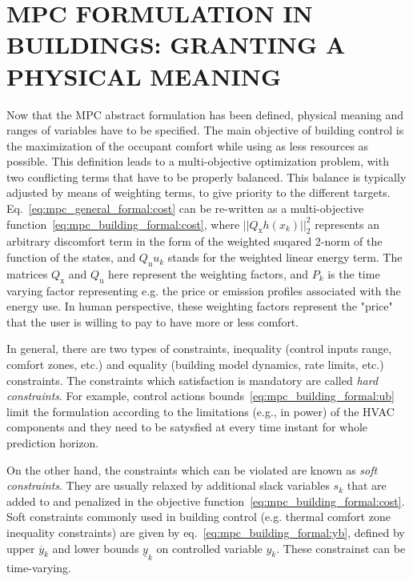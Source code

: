 \documentclass[10pt]{extarticle}
\begin{document}
\section{MPC FORMULATION IN BUILDINGS: GRANTING A PHYSICAL MEANING }

Now that the MPC abstract formulation has been defined, 
physical meaning and ranges of variables have to be specified.
The main objective of building control is the maximization of 
the occupant comfort while using as less resources as possible. 
This definition leads to a multi-objective optimization problem,
with two conflicting terms that have to be properly balanced. 
This balance is typically adjusted by means of weighting terms,
to give priority to the different targets.  
Eq.~\eqref{eq:mpc_general_formal:cost}
can be re-written as a multi-objective function~\eqref{eq:mpc_building_formal:cost},
where $||{Q_{\text{x}} h(x_{k})}||_2^2$ represents an arbitrary
discomfort term in the form of the weighted suqared 2-norm of
the function of the states, and ${Q_{\text{u}} u_{k}}$ stands
for the weighted linear energy term. The matrices $Q_{\text{x}}$
and $Q_{\text{u}}$ here represent the weighting factors, and
$P_k$ is the time varying factor representing e.g. the price
or emission profiles associated with the energy use.
In human perspective, these weighting factors represent the "price"
that the user is willing to pay to have more or less comfort.

In general, there are two types of constraints,
inequality  (control inputs range, comfort zones, etc.) and equality 
(building model dynamics, rate limits, etc.) constraints.
The constraints which satisfaction is mandatory are called 
\textit{hard constraints}. For example, control actions
bounds~\eqref{eq:mpc_building_formal:ub} limit the formulation
according to the limitations (e.g., in power) of the HVAC components
and they need to be satysfied at every time instant for whole prediction horizon.

On the other hand, the constraints which can be violated are
known as \textit{soft constraints}. They are usually relaxed
by additional slack variables $s_k$ that are added to and
penalized in the objective function~\eqref{eq:mpc_building_formal:cost}.
Soft constraints commonly used in building control (e.g. thermal comfort
zone inequality constraints) are given by eq.~\eqref{eq:mpc_building_formal:yb},
defined by upper $\overline{y}_k$  and lower bounds $\underline{y}_k$
on controlled variable $y_{k}$. These constrainst can be time-varying.
\end{document}

